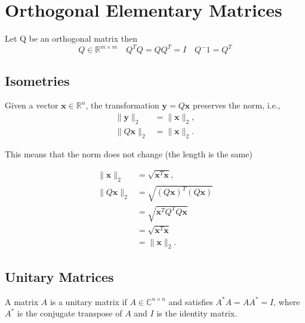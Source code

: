 \chapter[short]{Orthogonal Elementary Matrices}
Let Q be an orthogonal matrix then
$$Q \in \mathbb{R}^{m \times m} \quad Q^TQ = QQ^T = I \quad Q^-1 = Q^T $$

\section{Isometries}
Given a vector \( \mathbf{x} \in \mathbb{R}^n \), the transformation \( \mathbf{y} = Q\mathbf{x} \) preserves the norm, i.e.,
\begin{align*}
\| \mathbf{y} \|_2 &= \| \mathbf{x} \|_2, \\
\| Q\mathbf{x} \|_2 &= \| \mathbf{x} \|_2.
\end{align*}

This means that the norm does not change (the length is the same)
\begin{center}
\end{center}

\begin{align*}
\| \mathbf{x} \|_2 &= \sqrt{\mathbf{x}^T \mathbf{x}}, \\
\| Q\mathbf{x} \|_2 &= \sqrt{(Q\mathbf{x})^T (Q\mathbf{x})} \\
&= \sqrt{\mathbf{x}^T Q^T Q \mathbf{x}} \\
&= \sqrt{\mathbf{x}^T \mathbf{x}} \\
&= \| \mathbf{x} \|_2.
\end{align*}

\section{Unitary Matrices}
A matrix \( A \) is a unitary matrix if \( A \in \mathbb{C}^{n \times n} \) and satisfies \( A^*A = AA^* = I \), where \( A^* \) is the conjugate transpose of \( A \) and \( I \) is the identity matrix.

